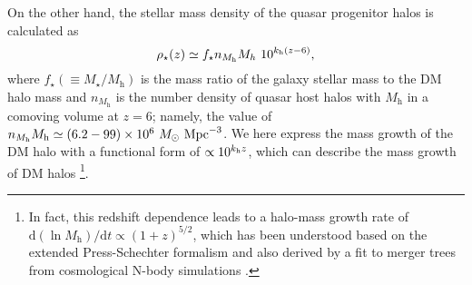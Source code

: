 \documentclass[twocolumn, twocolappendix]{aastex63}
\newcommand{\Msun}{M_\odot}
\newcommand{\Msunyr}{M_\odot~{\rm yr}^{-1}}
\newcommand{\Mh}{M_\mathrm{h}}
\newcommand{\D}{\mathrm{d}}
\begin{document}
\begin{CJK*}{UTF8}{gbsn}
On the other hand, the stellar mass density of the quasar progenitor halos is calculated as
%
\begin{equation}
\rho_{\star}(z)
\simeq f_\star n_{\Mh} M_h~ 10^{k_{\rm h}(z-6)},
\end{equation}
%
where $f_\star(\equiv M_\star/\Mh)$ is the mass ratio of the galaxy stellar mass to the DM halo mass and
$n_{\Mh}$ is the number density of quasar host halos with $\Mh$ in a comoving volume at $z=6$; namely,
the value of $n_{\Mh}\Mh \simeq (6.2-99)\times 10^6~\Msun~{\rm Mpc}^{-3}$.
We here express the mass growth of the DM halo with a functional form of $\propto 10^{k_{\rm h} z}$,
which can describe the mass growth of DM halos
\citep[e.g.,][]{2002ApJ...568...52W,2008MNRAS.383..615N,2008MNRAS.388.1792N,2010MNRAS.406.2267F}
\footnote[3]{
In fact, this redshift dependence leads to a halo-mass growth rate of $\D \left(\ln \Mh \right) / \D t \propto(1+z)^{5/2}$,
which has been understood based on the extended Press-Schechter formalism and also derived by
a fit to merger trees from cosmological N-body simulations \citep{2013MNRAS.435..999D}.}.



\end{CJK*}
\end{document}
